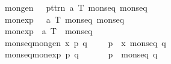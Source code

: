 \begin{isabellebody}
\ {\isachardoublequote}{\isacharunderscore}mongen{\isachardoublequote}\ \ {\isacharcolon}{\isacharcolon}\ {\isachardoublequote}{\isacharbrackleft}pttrn{\isacharcomma}\ {\isacharprime}a\ T{\isacharcomma}\ monseq{\isacharbrackright}{\isasymRightarrow}\ monseq{\isachardoublequote}\ \ \ {\isacharparenleft}{\isachardoublequote}{\isacharparenleft}{\isacharunderscore}{\isasymleftarrow}{\isacharparenleft}{\isacharunderscore}{\isacharparenright}{\isacharsemicolon}{\isacharslash}\ {\isacharunderscore}{\isacharparenright}{\isachardoublequote}\ \ {\isacharbrackleft}{}{}{\isacharcomma}\ {}{\isacharcomma}\ {}{\isacharbrackright}\ {}{\isacharparenright}\isanewline
\ {\isachardoublequote}{\isacharunderscore}monexp{\isachardoublequote}\ \ {\isacharcolon}{\isacharcolon}\ {\isachardoublequote}{\isacharbrackleft}{\isacharprime}a\ T{\isacharcomma}\ monseq{\isacharbrackright}{\isasymRightarrow}\ monseq{\isachardoublequote}\ \ \ \ \ \ \ \ \ {\isacharparenleft}{\isachardoublequote}{\isacharparenleft}{\isacharunderscore}{\isacharsemicolon}{\isacharslash}\ {\isacharunderscore}{\isacharparenright}{\isachardoublequote}\ \ \ \ \ \ \ {\isacharbrackleft}{}{\isacharcomma}\ {}{\isacharbrackright}\ {}{\isacharparenright}\isanewline
\ {\isachardoublequote}{\isacharunderscore}monexp{}{\isachardoublequote}\ {\isacharcolon}{\isacharcolon}\ {\isachardoublequote}{\isacharbrackleft}{\isacharprime}a\ T{\isacharbrackright}\ {\isasymRightarrow}\ monseq{\isachardoublequote}\ \ \ \ \ \ \ \ \ \ \ \ \ \ \ \ {\isacharparenleft}{\isachardoublequote}{\isacharparenleft}{\isacharunderscore}{\isacharparenright}{\isachardoublequote}\ \ \ \ \ \ \ \ \ {}{\isacharparenright}\isanewline
\isanewline
\isamarkupfalse%
\isanewline
\ %
\isanewline
\ {\isachardoublequote}{\isacharunderscore}monseq{\isacharparenleft}{\isacharunderscore}mongen\ x\ p\ q{\isacharparenright}{\isachardoublequote}\ \ \ \ {\isasymrightharpoonup}\ {\isachardoublequote}p\ {\isasymggreater}{\isacharequal}\ {\isacharparenleft}{\isacharpercent}x{\isachardot}\ {\isacharparenleft}{\isacharunderscore}monseq\ q{\isacharparenright}{\isacharparenright}{\isachardoublequote}\isanewline
\ {\isachardoublequote}{\isacharunderscore}monseq{\isacharparenleft}{\isacharunderscore}monexp\ p\ q{\isacharparenright}{\isachardoublequote}\ \ \ \ \ \ {\isasymrightharpoonup}\ {\isachardoublequote}p\ {\isasymggreater}\ {\isacharparenleft}{\isacharunderscore}monseq\ q{\isacharparenright}{\isachardoublequote}\isanewline

\end{isabellebody}
